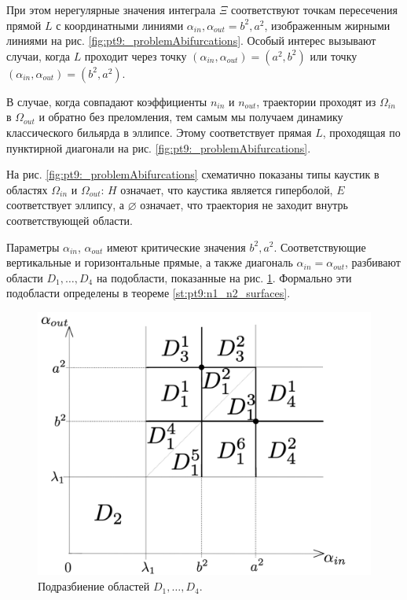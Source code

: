 

При этом нерегулярные значения интеграла $\Xi$ соответствуют точкам пересечения  прямой $L$ с координатными линиями $\alpha_{in},\alpha_{out} = b^2, a^2$, изображенным жирными линиями на рис. \ref{fig:pt9:_problemAbifurcations}.
Особый интерес вызывают случаи, когда $L$ проходит через точку $(\alpha_{in}, \alpha_{out}) = (a^2, b^2)$ или точку  $(\alpha_{in}, \alpha_{out}) = (b^2, a^2)$.
\begin{remark}
В случае, когда совпадают коэффициенты $n_{in}$ и $n_{out}$, траектории проходят из $\Omega_{in}$ в $\Omega_{out}$ и обратно без преломления, тем самым мы получаем динамику классического бильярда в эллипсе. Этому соответствует прямая $L$, проходящая по пунктирной диагонали на рис. \ref{fig:pt9:_problemAbifurcations}.

На рис. \ref{fig:pt9:_problemAbifurcations} схематично показаны типы каустик в областях $\Omega_{in}$ и $\Omega_{out}$:  $H$ означает, что каустика является гиперболой, $E$ соответствует эллипсу, а $\varnothing$ означает, что траектория не заходит внутрь соответствующей области. 
\label{rem:remark1}
\end{remark}

Параметры  $\alpha_{in}$, $\alpha_{out}$ имеют критические значения $b^2, a^2$. Соответствующие вертикальные и горизонтальные прямые, а также диагональ $\alpha_{in} = \alpha_{out}$, разбивают области $D_1, \ldots, D_4$ на подобласти, показанные на рис. \ref{fig:pt9:_problemA_subdivisions}. Формально эти подобласти определены в теореме \ref{st:pt9:n1_n2_surfaces}.
\begin{figure}[!htb]
\centering
\includegraphics[scale=0.1]{images/ch4/section2/problemA_subdivisions.pdf}
    \caption{Подразбиение областей $D_1, \ldots, D_4$.}
    \label{fig:pt9:_problemA_subdivisions}
\end{figure}

